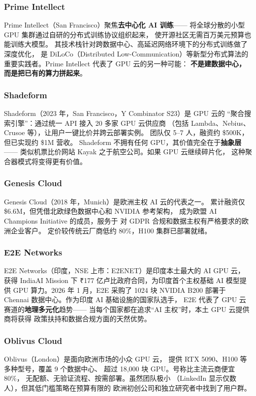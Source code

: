 \subsubsection{Prime Intellect}
Prime Intellect（San Francisco）聚焦\textbf{去中心化 AI 训练}——
将全球分散的小型 GPU 集群通过自研的分布式训练协议组织起来，
使开源社区无需百万美元预算也能训练大模型。
其技术栈针对跨数据中心、高延迟网络环境下的分布式训练做了深度优化，
是 DiLoCo（Distributed Low-Communication）等新型分布式算法的
重要实践者。Prime Intellect 代表了 GPU 云的另一种可能：
\textbf{不是建数据中心，而是把已有的算力拼起来}。

\subsubsection{Shadeform}
Shadeform（2023 年，San Francisco，Y Combinator S23）是 GPU 云的
``聚合搜索引擎''：通过统一 API 接入 20 多家 GPU 云供应商
（包括 Lambda、Nebius、Crusoe 等），让用户一键比价并跨云部署实例。
团队仅 5--7 人，融资约 \$500K，但已实现约 \$1M 营收。
Shadeform 不拥有任何 GPU，其价值完全在于\textbf{抽象层}——
类似机票比价网站 Kayak 之于航空公司。如果 GPU 云继续碎片化，
这种聚合器模式将变得更有价值。

\subsubsection{Genesis Cloud}
Genesis Cloud（2018 年，Munich）是欧洲主权 AI 云的代表之一。
累计融资仅 \$6.6M，但凭借北欧绿色数据中心和 NVIDIA 参考架构，
成为欧盟 AI Champions Initiative 的成员，服务于
对 GDPR 合规和数据主权有严格要求的欧洲企业客户。
定价较传统云厂商低约 80\%，H100 集群已部署就绪。

\subsubsection{E2E Networks}
E2E Networks（印度，NSE 上市：E2ENET）是印度本土最大的 AI GPU 云，
获得 IndiaAI Mission 下 ₹177 亿卢比政府合同，为印度首个主权基础
AI 模型提供 GPU 算力。2026 年 1 月，E2E 采购了 1024 块 NVIDIA B200
部署于 Chennai 数据中心。作为印度 AI 基础设施的国家队选手，
E2E 代表了 GPU 云赛道的\textbf{地理多元化}趋势——
当每个国家都在追求``AI 主权''时，本土 GPU 云提供商将获得
政策扶持和数据合规方面的天然优势。

\subsubsection{Oblivus Cloud}
Oblivus（London）是面向欧洲市场的小众 GPU 云，
提供 RTX 5090、H100 等多种型号，覆盖 9 个数据中心、
超过 18,000 块 GPU。号称比主流云商便宜 80\%，
无配额、无验证流程、按需部署。虽然团队极小
（LinkedIn 显示仅数人），但其低门槛策略在预算有限的
欧洲初创公司和独立研究者中找到了用户群。
